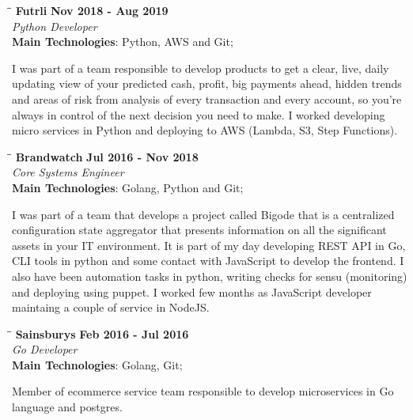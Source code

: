 \documentclass[margin]{res}
\begin{document}
\begin{resume}
\vspace{-0.1in}
   \begin{tabbing}
   \hspace{2.3in}\= \hspace{1.7in}\= \kill
    \textbf{Futrli}    \>\>\textbf{Nov 2018 - Aug 2019}\\
    \textit{Python Developer}\\        
    \textbf{Main Technologies}: Python, AWS and Git;
   \end{tabbing}\vspace{-20pt}
    \vspace{2mm}
I was part of a team responsible to develop products to get a clear, live, daily updating view of your predicted cash,
profit, big payments ahead, hidden trends and areas of risk from analysis of every transaction and every account,
so you’re always in control of the next decision you need to make.   
I worked developing micro services in Python and deploying to AWS (Lambda, S3, Step Functions).

\vspace{-0.1in}
   \begin{tabbing}
   \hspace{2.3in}\= \hspace{1.7in}\= \kill
    \textbf{Brandwatch}    \>\>\textbf{Jul 2016 - Nov 2018}\\
    \textit{Core Systems Engineer}\\        
    \textbf{Main Technologies}: Golang, Python and Git;
   \end{tabbing}\vspace{-20pt}
    \vspace{2mm}
I was part of a team that develops a project called Bigode that is a centralized configuration state
aggregator that presents information on all the significant assets in your IT environment. It is
part of my day developing REST API in Go, CLI tools in python and some contact with JavaScript to develop the frontend.
I also have been automation tasks in python, writing checks for sensu (monitoring) and deploying using puppet.
I worked few months as JavaScript developer maintaing a couple of service in NodeJS.

\vspace{-0.1in}
   \begin{tabbing}
   \hspace{2.3in}\= \hspace{1.7in}\= \kill
    \textbf{Sainsburys}    \>\>\textbf{Feb 2016 - Jul 2016}\\
    \textit{Go Developer}\\        
    \textbf{Main Technologies}: Golang, Git;
   \end{tabbing}\vspace{-20pt}
    \vspace{2mm}
Member of ecommerce service team responsible to develop microservices in Go language and postgres.


\end{resume}
\end{document}
